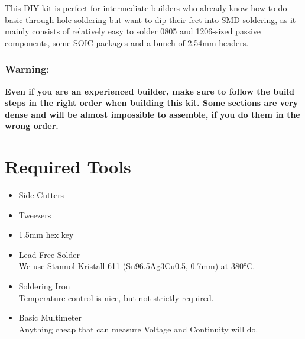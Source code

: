 \documentclass[12pt, a4paper]{article}
\begin{document}
\vspace{3mm}

This DIY kit is perfect for intermediate builders who already know how to do basic through-hole
soldering but want to dip their feet into SMD soldering, as it mainly consists of relatively
easy to solder 0805 and 1206-sized passive components, some SOIC packages and a bunch of 2.54mm
headers.

{
    \color{red}
    \subsubsection*{Warning:}
    \vspace{-3mm}
    \textbf{%
        Even if you are an experienced builder, make sure to follow the build steps in the right
        order when building this kit. Some sections are very dense and will be almost impossible
        to assemble, if you do them in the wrong order.
    }
    \vspace{5mm}
}

\pagebreak

\section*{Required Tools}

\begin{itemize}
    \item Side Cutters
    \item Tweezers
    \item 1.5mm hex key
    \item Lead-Free Solder
    \\ {\small We use Stannol Kristall 611 (Sn96.5Ag3Cu0.5, 0.7mm) at 380°C.}
    \item Soldering Iron
    \\ {\small Temperature control is nice, but not strictly required.}
    \item Basic Multimeter
    \\ {\small Anything cheap that can measure Voltage and Continuity will do.}
\end{itemize}
\end{document}

